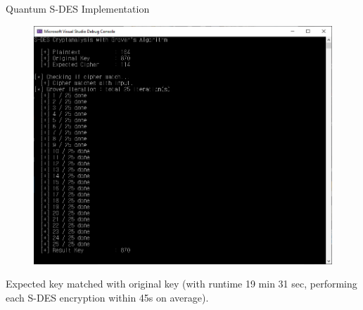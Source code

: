 \documentclass{beamer}
\begin{document}
    \begin{frame}{Quantum S-DES Implementation}
        \begin{figure}
            \centering
            \includegraphics[height=0.5\textheight]{./Images/Qsharp-SDES-Grover-k1.png}
        \end{figure}
        Expected key matched with original key (with runtime 19 min 31 sec, performing each S-DES encryption within 45s on average).
    \end{frame}
\end{document}
